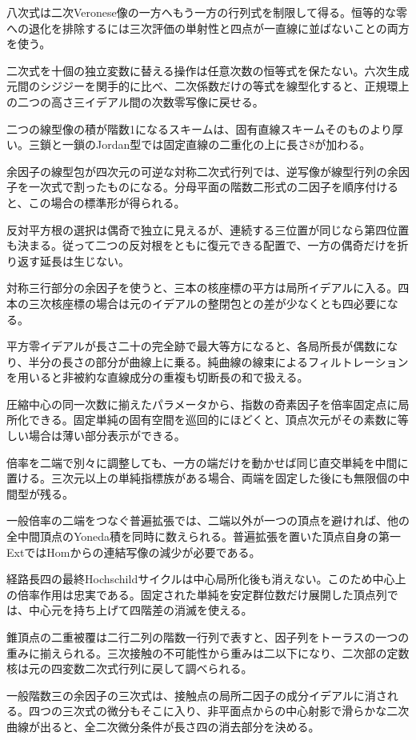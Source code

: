 \documentclass[11pt,a4paper]{ltjsarticle}
\begin{document}
八次式は二次Veronese像の一方へもう一方の行列式を制限して得る。恒等的な零への退化を排除するには三次評価の単射性と四点が一直線に並ばないことの両方を使う。

二次式を十個の独立変数に替える操作は任意次数の恒等式を保たない。六次生成元間のシジジーを関手的に比べ、二次係数だけの等式を線型化すると、正規環上の二つの高さ三イデアル間の次数零写像に戻せる。

二つの線型像の積が階数1になるスキームは、固有直線スキームそのものより厚い。三鎖と一鎖のJordan型では固定直線の二重化の上に長さ8が加わる。

余因子の線型包が四次元の可逆な対称二次式行列では、逆写像が線型行列の余因子を一次式で割ったものになる。分母平面の階数二形式の二因子を順序付けると、この場合の標準形が得られる。

反対平方根の選択は偶奇で独立に見えるが、連続する三位置が同じなら第四位置も決まる。従って二つの反対根をともに復元できる配置で、一方の偶奇だけを折り返す延長は生じない。

対称三行部分の余因子を使うと、三本の核座標の平方は局所イデアルに入る。四本の三次核座標の場合は元のイデアルの整閉包との差が少なくとも四必要になる。

平方零イデアルが長さ二十の完全跡で最大等方になると、各局所長が偶数になり、半分の長さの部分が曲線上に乗る。純曲線の線束によるフィルトレーションを用いると非被約な直線成分の重複も切断長の和で扱える。

圧縮中心の同一次数に揃えたパラメータから、指数の奇素因子を倍率固定点に局所化できる。固定単純の固有空間を巡回的にほどくと、頂点次元がその素数に等しい場合は薄い部分表示ができる。

倍率を二端で別々に調整しても、一方の端だけを動かせば同じ直交単純を中間に置ける。三次元以上の単純指標族がある場合、両端を固定した後にも無限個の中間型が残る。

一般倍率の二端をつなぐ普遍拡張では、二端以外が一つの頂点を避ければ、他の全中間頂点のYoneda積を同時に数えられる。普遍拡張を置いた頂点自身の第一ExtではHomからの連結写像の減少が必要である。

経路長四の最終Hochschildサイクルは中心局所化後も消えない。このため中心上の倍率作用は忠実である。固定された単純を安定群位数だけ展開した頂点列では、中心元を持ち上げて四階差の消滅を使える。

錐頂点の二重被覆は二行二列の階数一行列で表すと、因子列をトーラスの一つの重みに揃えられる。三次接触の不可能性から重みは二以下になり、二次部の定数核は元の四変数二次式行列に戻して調べられる。

一般階数三の余因子の三次式は、接触点の局所二因子の成分イデアルに消される。四つの三次式の微分もそこに入り、非平面点からの中心射影で滑らかな二次曲線が出ると、全二次微分条件が長さ四の消去部分を決める。
\end{document}
